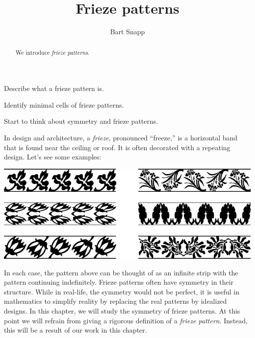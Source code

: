 \documentclass[noauthor,nooutcomes,hints,handout]{ximera}
\author{Bart Snapp}
\title{Frieze patterns}
\begin{document}
\begin{abstract}
  We introduce \emph{frieze patterns}.
\end{abstract}
\maketitle

\begin{listOutcomes}
\item Describe what a frieze pattern is.
\item Identify minimal cells of frieze patterns.
\item Start to think about symmetry and frieze patterns.
\end{listOutcomes}

In design and architecture, a \emph{frieze},
pronounced ``freeze,'' is a horizontal band that is found near the
ceiling or roof. It is often decorated with a repeating design. Let's
see some examples:
\begin{center}
\includegraphics[width=.6\textwidth]{fpfrieze.pdf}
\end{center}
In each case, the pattern above can be thought of as an infinite strip
with the pattern continuing indefinitely.  Frieze patterns often have
symmetry in their structure. While in real-life, the symmetry would
not be perfect, it is useful in mathematics to simplify reality by
replacing the real patterns by idealized designs.  In this chapter, we
will study the symmetry of frieze patterns. At this point we will
refrain from giving a rigorous definition of a \emph{frieze
  pattern}. Instead, this will be a result of our work in this
chapter.
\end{document}
